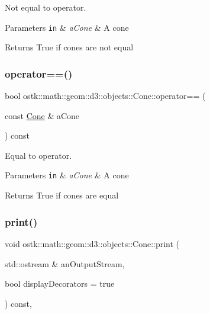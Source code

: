 Not equal to operator. 


\begin{DoxyParams}[1]{Parameters}
\mbox{\tt in}  & {\em a\+Cone} & A cone \\
\hline
\end{DoxyParams}
\begin{DoxyReturn}{Returns}
True if cones are not equal 
\end{DoxyReturn}
\mbox{\label{classostk_1_1math_1_1geom_1_1d3_1_1objects_1_1_cone_a705e91fbd024f12e214030fd3a4ad8a0}} 
\subsubsection{\texorpdfstring{operator==()}{operator==()}}
{\footnotesize\ttfamily bool ostk\+::math\+::geom\+::d3\+::objects\+::\+Cone\+::operator== (\begin{DoxyParamCaption}\item[{const \hyperlink{classostk_1_1math_1_1geom_1_1d3_1_1objects_1_1_cone}{Cone} \&}]{a\+Cone }\end{DoxyParamCaption}) const}



Equal to operator. 


\begin{DoxyParams}[1]{Parameters}
\mbox{\tt in}  & {\em a\+Cone} & A cone \\
\hline
\end{DoxyParams}
\begin{DoxyReturn}{Returns}
True if cones are equal 
\end{DoxyReturn}
\mbox{\label{classostk_1_1math_1_1geom_1_1d3_1_1objects_1_1_cone_a511e3f582e15b11f9b571ec199fdf707}} 
\subsubsection{\texorpdfstring{print()}{print()}}
{\footnotesize\ttfamily void ostk\+::math\+::geom\+::d3\+::objects\+::\+Cone\+::print (\begin{DoxyParamCaption}\item[{std\+::ostream \&}]{an\+Output\+Stream,  }\item[{bool}]{display\+Decorators = {\ttfamily true} }\end{DoxyParamCaption}) const\hspace{0.3cm}{\ttfamily [override]}, {\ttfamily [virtual]}}



